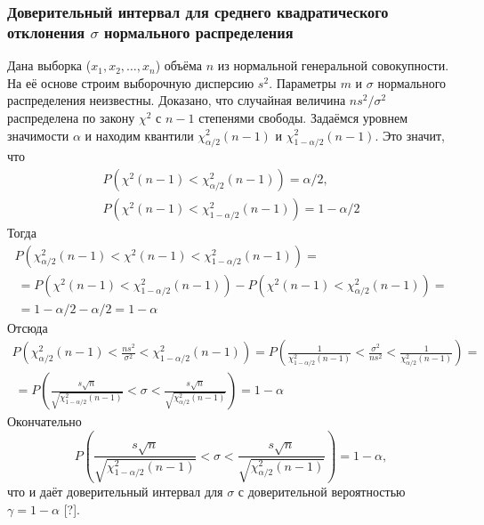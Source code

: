 \subsubsection{Доверительный интервал для среднего квадратического отклонения $\sigma$ нормального распределения}
Дана выборка ($x_{1},x_{2}, \dots ,x_{n}$) объёма $n$ из нормальной генеральной совокупности. На её основе строим выборочную дисперсию $s^{2}$. Параметры $m$ и $\sigma$ нормального распределения неизвестны. Доказано, что случайная величина $ns^{2}/\sigma^{2}$ распределена по закону $\chi^{2}$ с $n-1$ степенями свободы.
\newline
Задаёмся уровнем значимости $\alpha$ и находим квантили $\chi^{2}_{\alpha/2}(n-1)$ и $\chi^{2}_{1-\alpha/2}(n-1)$.
\newline
Это значит, что 
\begin{equation}
	\begin{split}
		P\left(\chi^{2}(n-1) < \chi^{2}_{\alpha/2}(n-1)\right) = \alpha/2, \\
		P\left(\chi^{2}(n-1) < \chi^{2}_{1-\alpha/2}(n-1)\right) = 1-\alpha/2
	\end{split}
	\label{eq:P_chi_2x2}        
\end{equation}
Тогда
\begin{multline}
	P\left(\chi^{2}_{\alpha/2}(n-1) < \chi^{2}(n-1) < \chi^{2}_{1-\alpha/2}(n-1)\right) = \\\ =
	P\left(\chi^{2}(n-1) < \chi^{2}_{1-\alpha/2}(n-1)\right) -P\left(\chi^{2}(n-1) < \chi^{2}_{\alpha/2}(n-1)\right) = \\\ = 1 - \alpha/2 -\alpha/2 = 1 - \alpha
	\label{eq:P_chi_2}
\end{multline}
Отсюда
\begin{multline}
	P\left(\chi^{2}_{\alpha/2}(n-1) < \frac{ns^{2}}{\sigma^{2}} < \chi^{2}_{1-\alpha/2}(n-1)\right) =
	P\left(\frac{1}{\chi^{2}_{1-\alpha/2}(n-1)} < \frac{\sigma^{2}}{ns^{2}} < \frac{1}{\chi^{2}_{\alpha/2}(n-1)} \right) = \\\ =
	P\left(\frac{s\sqrt{n}}{\sqrt{\chi^{2}_{1-\alpha/2}(n-1)}} < \sigma <  \frac{s\sqrt{n}}{\sqrt{\chi^{2}_{\alpha/2}(n-1)}}\right) = 1- \alpha
	\label{eq:interv}
\end{multline}
Окончательно
\begin{equation}
	P\left(\frac{s\sqrt{n}}{\sqrt{\chi^{2}_{1-\alpha/2}(n-1)}} < \sigma <  \frac{s\sqrt{n}}{\sqrt{\chi^{2}_{\alpha/2}(n-1)}}\right) = 1- \alpha,
	\label{eq:fin_interval}
\end{equation}
что и даёт доверительный интервал для $\sigma$ с доверительной вероятностью $\gamma = 1 - \alpha$ [?].

